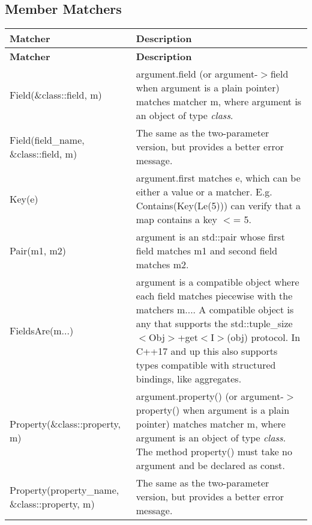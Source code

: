 \subsection*{Member Matchers}

\tabulinesep=1mm
\begin{longtabu} spread 0pt [c]{*{2}{|X[-1]}|}
\hline
\rowcolor{\tableheadbgcolor}\textbf{ Matcher  }&\textbf{ Description   }\\
\endfirsthead
\hline
\endfoot
\hline
\rowcolor{\tableheadbgcolor}\textbf{ Matcher  }&\textbf{ Description   }\\
\endhead
{\ttfamily Field(\&class\+::field, m)}  &{\ttfamily argument.\+field} (or {\ttfamily argument-\/$>$field} when {\ttfamily argument} is a plain pointer) matches matcher {\ttfamily m}, where {\ttfamily argument} is an object of type {\itshape class}.   \\
{\ttfamily Field(field\+\_\+name, \&class\+::field, m)}  &The same as the two-\/parameter version, but provides a better error message.   \\
{\ttfamily Key(e)}  &{\ttfamily argument.\+first} matches {\ttfamily e}, which can be either a value or a matcher. E.\+g. {\ttfamily Contains(Key(\+Le(5)))} can verify that a {\ttfamily map} contains a key {\ttfamily $<$= 5}.   \\
{\ttfamily Pair(m1, m2)}  &{\ttfamily argument} is an {\ttfamily std\+::pair} whose {\ttfamily first} field matches {\ttfamily m1} and {\ttfamily second} field matches {\ttfamily m2}.   \\
{\ttfamily Fields\+Are(m...)}  &{\ttfamily argument} is a compatible object where each field matches piecewise with the matchers {\ttfamily m...}. A compatible object is any that supports the {\ttfamily std\+::tuple\+\_\+size$<$Obj$>$}+{\ttfamily get$<$I$>$(obj)} protocol. In C++17 and up this also supports types compatible with structured bindings, like aggregates.   \\
{\ttfamily Property(\&class\+::property, m)}  &{\ttfamily argument.\+property()} (or {\ttfamily argument-\/$>$property()} when {\ttfamily argument} is a plain pointer) matches matcher {\ttfamily m}, where {\ttfamily argument} is an object of type {\itshape class}. The method {\ttfamily property()} must take no argument and be declared as {\ttfamily const}.   \\
{\ttfamily Property(property\+\_\+name, \&class\+::property, m)}  &The same as the two-\/parameter version, but provides a better error message.   \\
\end{longtabu}


